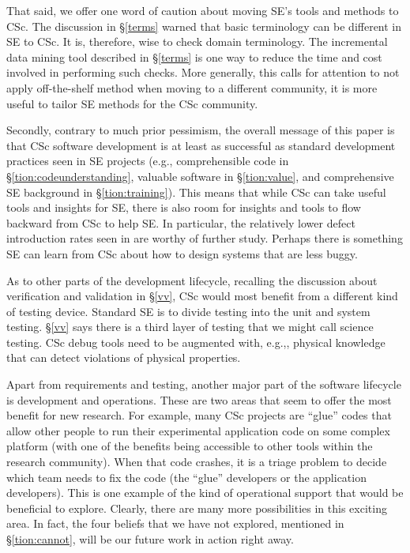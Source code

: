 \documentclass[conference,10pt]{IEEEtran}
\begin{document}
That said,  we offer one word of caution about moving SE's tools and methods to CSc. The discussion in \S\ref{terms} warned that basic terminology can be different in SE to CSc. It is, therefore, wise to check domain terminology. The incremental data mining tool described in \S\ref{terms} is one way to reduce the time and cost
involved in performing such checks. More generally, this calls for attention to not apply off-the-shelf method when moving to a different community, it is more useful to tailor SE methods for the CSc community.

Secondly, contrary to much prior pessimism, the overall message of this paper is that CSc software development is at least as successful as standard development practices seen in SE projects (e.g., comprehensible code in \S\ref{tion:codeunderstanding}, valuable software in \S\ref{tion:value}, and comprehensive SE background in \S\ref{tion:training}). This means that while CSc can take useful tools and insights for SE, there is also room for insights and tools to flow backward from CSc to help SE.
In particular, the relatively lower defect introduction rates seen in  are worthy of further study. Perhaps there is something SE can learn from CSc about how to design systems that are less buggy.


As to other parts of the development lifecycle,  recalling the discussion about verification and validation in \S\ref{vv}, CSc would most benefit from a different kind of testing device. Standard SE is to divide testing into the unit and system testing. \S\ref{vv} says there is a third layer of testing that we might call science testing. CSc debug tools need to be augmented with, e.g.,,  physical knowledge that can detect violations of physical properties.

Apart from requirements and testing, another major part of the software lifecycle is development and operations. These are two areas that seem to offer the most benefit for new research. For example, many CSc projects are ``glue'' codes that allow other people to run their experimental application code on some complex platform (with one of the benefits being accessible to other tools within the research community). When that code crashes, it is a triage problem to decide which team needs to fix the code (the ``glue'' developers or the application developers). This is one example of the kind of operational support that would be beneficial to explore. Clearly, there are many more possibilities in this exciting area. In fact, the four beliefs that we have not explored, mentioned in \S\ref{tion:cannot}, will be our future work in action right away. 
\end{document}
